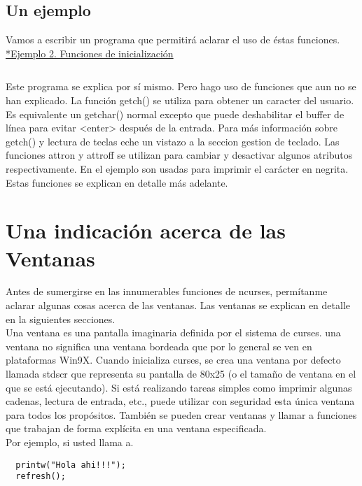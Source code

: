 \documentclass{article}
\begin{document}
\subsection{Un ejemplo}%
Vamos a escribir un programa que permitirá aclarar el uso de éstas funciones.\\

\href{https://github.com/nasciiboy/NCURSES-Programming-HOWTO/blob/master/ncurses_programs/basics/init_func_example.c}{*Ejemplo 2. Funciones de inicialización} 
\inputminted{cpp}{./cpp/002_funciones_inicializacion.cpp}

Este programa se explica por sí mismo. Pero hago uso de funciones que aun no se
han explicado. La función getch() se utiliza para obtener un caracter del
usuario. Es equivalente un getchar() normal excepto que puede deshabilitar el
buffer de línea para evitar <enter> después de la entrada. Para más información
sobre getch() y lectura de teclas eche un vistazo a la seccion gestion de
teclado. Las funciones attron y attroff se utilizan para cambiar y desactivar
algunos atributos respectivamente. En el ejemplo son usadas para imprimir el
carácter en negrita. Estas funciones se explican en detalle más adelante.

\section{Una indicación acerca de las Ventanas}%
Antes de sumergirse en las innumerables funciones de ncurses, permítanme
aclarar algunas cosas acerca de las ventanas. Las ventanas se explican en
detalle en la siguientes secciones.\\

Una ventana es una pantalla imaginaria definida por el sistema de curses. una
ventana no significa una ventana bordeada que por lo general se ven en
plataformas Win9X. Cuando inicializa curses, se crea una ventana por defecto
llamada stdscr que representa su pantalla de 80x25 (o el tamaño de ventana en
el que se está ejecutando). Si está realizando tareas simples como imprimir
algunas cadenas, lectura de entrada, etc., puede utilizar con seguridad esta
única ventana para todos los propósitos. También se pueden crear ventanas y
llamar a funciones que trabajan de forma explícita en una ventana especificada.\\

Por ejemplo, si usted llama a.

\begin{verbatim}
  printw("Hola ahi!!!");
  refresh();
\end{verbatim}
\end{document}
